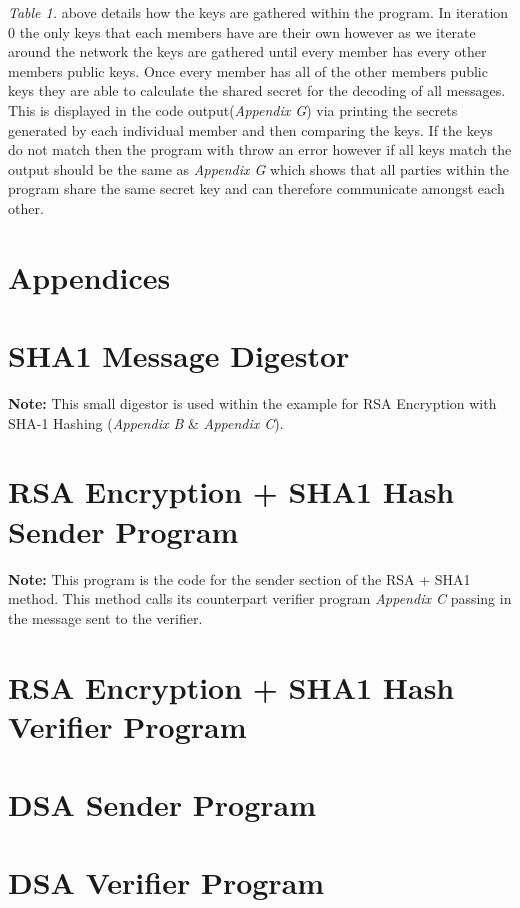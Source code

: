 \documentclass[a4paper, twoside, 11pt]{article}
\begin{document}
\textit{Table 1.} above details how the keys are gathered within the program. In iteration 0 the only keys that each members have are their own however as we iterate around the network the keys are gathered until every member has every other members public keys. Once every member has all of the other members public keys they are able to calculate the shared secret for the decoding of all messages. This is displayed in the code output(\textit{Appendix G}) via printing the secrets generated by each individual member and then comparing the keys. If the keys do not match then the program with throw an error however if all keys match the output should be the same as \textit{Appendix G} which shows that all parties within the program share the same secret key and can therefore communicate amongst each other. 

\newpage
\section*{Appendices}
\appendix
\section{SHA1 Message Digestor}
\textbf{Note:} This small digestor is used within the example for RSA Encryption with SHA-1 Hashing (\textit{Appendix B} \& \textit{Appendix C}).

\newpage
\section{RSA Encryption + SHA1 Hash Sender Program}
\textbf{Note:} This program is the code for the sender section of the RSA + SHA1 method. This method calls its counterpart verifier program \textit{Appendix C} passing in the message sent to the verifier.

\newpage
\section{RSA Encryption + SHA1 Hash Verifier Program}

\newpage
\section{DSA Sender Program}

\newpage
\section{DSA Verifier Program}

\newpage
\end{document}
